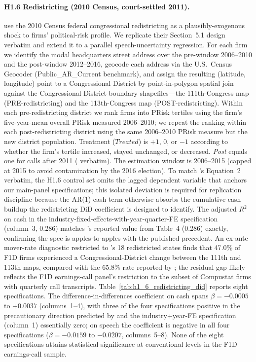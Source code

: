 \paragraph{H1.6 Redistricting (2010 Census, court-settled 2011).}
 use the 2010 Census federal congressional redistricting as a plausibly-exogenous shock to firms' political-risk profile. We replicate their Section~5.1 design verbatim and extend it to a parallel speech-uncertainty regression. For each firm we identify the modal headquarters street address over the pre-window 2006--2010 and the post-window 2012--2016, geocode each address via the U.S.\ Census Geocoder (Public\_AR\_Current benchmark), and assign the resulting (latitude, longitude) point to a Congressional District by point-in-polygon spatial join against the  Congressional District boundary shapefiles---the 111th-Congress map (PRE-redistricting) and the 113th-Congress map (POST-redistricting). Within each pre-redistricting district we rank firms into PRisk tertiles using the firm's five-year-mean overall PRisk \cite{hassan2020} measured 2006--2010; we repeat the ranking within each post-redistricting district using the same 2006--2010 PRisk measure but the new district population. Treatment ($\textit{Treated}$) is $+1$, $0$, or $-1$ according to whether the firm's tertile increased, stayed unchanged, or decreased. \textit{Post} equals one for calls after 2011 ( verbatim). The estimation window is 2006--2015 (capped at 2015 to avoid contamination by the 2016 election). To match 's Equation~2 verbatim, the H1.6 control set omits the lagged dependent variable that anchors our main-panel specifications; this isolated deviation is required for replication discipline because the AR(1) cash term otherwise absorbs the cumulative cash buildup the redistricting DiD coefficient is designed to identify. The adjusted $R^2$ on cash in the industry-fixed-effects-with-year-quarter-FE specification (column~3, 0.286) matches 's reported value from Table~4 (0.286) exactly, confirming the spec is apples-to-apples with the published precedent. An ex-ante mover-rate diagnostic restricted to 's 18 redistricted states finds that 47.0\% of F1D firms experienced a Congressional-District change between the 111th and 113th maps, compared with the 65.8\% rate reported by ; the residual gap likely reflects the F1D earnings-call panel's restriction to the subset of Compustat firms with quarterly call transcripts. Table~\ref{tab:h1_6_redistricting_did} reports eight specifications. The difference-in-differences coefficient on cash spans $\beta = -0.0005$ to $+0.0037$ (columns~1--4), with three of the four specifications positive in the precautionary direction predicted by  and the industry$+$year-FE specification (column~1) essentially zero; on speech the coefficient is negative in all four specifications ($\beta = -0.0159$ to $-0.0207$, columns~5--8). None of the eight specifications attains statistical significance at conventional levels in the F1D earnings-call sample.

